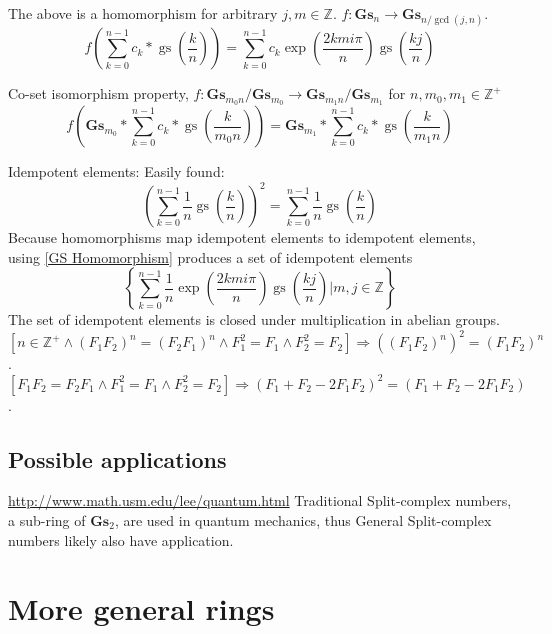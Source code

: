\documentclass[]{article}
\DeclareMathOperator{\gs}{gs}
\newcommand{\pqty}[1]{{\left(#1\right)}}
\newcommand{\Bqty}[1]{{\left\{#1\right\}}}
\newcommand{\bqty}[1]{{\left[#1\right]}}
\begin{document}
	The above is a homomorphism for arbitrary $j,m\in\mathbb{Z}$. $f:\mathbf{Gs}_n\rightarrow\mathbf{Gs}_{n/\gcd\pqty{j,n}}$.
	\begin{equation}
	\label{GS Homomorphism}
	f\pqty{\sum_{k=0}^{n-1} c_k*\gs\pqty{\frac{k}{n}}}=\sum_{k=0}^{n-1} c_k\exp\pqty{\frac{2kmi\pi}{n}}\gs\pqty{\frac{kj}{n}}
	\end{equation}
	
	Co-set isomorphism property, $f:\mathbf{Gs}_{m_0n}/\mathbf{Gs}_{m_0}\rightarrow \mathbf{Gs}_{m_1n}/\mathbf{Gs}_{m_1}$ for $n,m_0,m_1\in\mathbb{Z}^+$
	\begin{equation}
	f\pqty{\mathbf{Gs}_{m_0}*\sum_{k=0}^{n-1} c_k*\gs\pqty{\frac{k}{m_0n}}}=\mathbf{Gs}_{m_1}*\sum_{k=0}^{n-1} c_k*\gs\pqty{\frac{k}{m_1n}}
	\end{equation}
	
	Idempotent elements: Easily found:
	\begin{equation}
	\pqty{\sum_{k=0}^{n-1}\frac{1}{n}\gs\pqty{\frac{k}{n}}}^2
	=
	\sum_{k=0}^{n-1}\frac{1}{n}\gs\pqty{\frac{k}{n}}
	\end{equation}
	Because homomorphisms map idempotent elements to idempotent elements, using \eqref{GS Homomorphism} produces a set of idempotent elements
	\begin{equation}
	\Bqty{ \sum_{k=0}^{n-1} \frac{1}{n}\exp\pqty{\frac{2kmi\pi}{n}}\gs\pqty{\frac{kj}{n}} \Bigg\vert m,j\in\mathbb{Z} }
	\end{equation}
	The set of idempotent elements is closed under multiplication in abelian groups.
	\begin{equation}
	\bqty{n\in\mathbb{Z}^+\land\pqty{F_1F_2}^n=\pqty{F_2F_1}^n\land F_1^2=F_1\land F_2^2=F_2}\Rightarrow \pqty{\pqty{F_1F_2}^n}^2=\pqty{F_1F_2}^n
	\end{equation}.
	\begin{equation}
	\bqty{F_1F_2=F_2F_1\land F_1^2=F_1\land F_2^2=F_2}\Rightarrow \pqty{{F_1+F_2-2F_1F_2}}^2=\pqty{F_1+F_2-2F_1F_2}
	\end{equation}.
	
	\subsection{Possible applications}
	\url{http://www.math.usm.edu/lee/quantum.html} Traditional Split-complex numbers, a sub-ring of $\mathbf{Gs}_2$, are used in quantum mechanics, thus General Split-complex numbers likely also have application.
	
	\section{More general rings}
\end{document}
